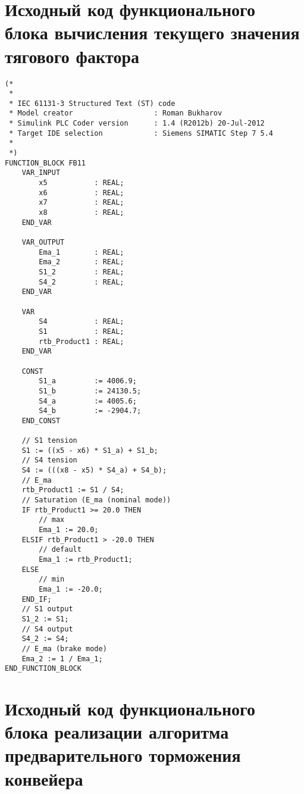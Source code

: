 \section{Исходный код функционального блока вычисления текущего значения тягового фактора} \label{AppendixB2}
\fontsize{11pt}{12pt}\selectfont

\begin{verbatim}
(*
 *
 * IEC 61131-3 Structured Text (ST) code
 * Model creator                   : Roman Bukharov
 * Simulink PLC Coder version      : 1.4 (R2012b) 20-Jul-2012
 * Target IDE selection            : Siemens SIMATIC Step 7 5.4
 *
 *)
FUNCTION_BLOCK FB11
    VAR_INPUT
        x5           : REAL;
        x6           : REAL;
        x7           : REAL;
        x8           : REAL;
    END_VAR
    
    VAR_OUTPUT
        Ema_1        : REAL;
        Ema_2        : REAL;
        S1_2         : REAL;
        S4_2         : REAL;
    END_VAR
    
    VAR
        S4           : REAL;
        S1           : REAL;
        rtb_Product1 : REAL;
    END_VAR
    
    CONST
        S1_a         := 4006.9;
        S1_b         := 24130.5;
        S4_a         := 4005.6;
        S4_b         := -2904.7;
    END_CONST
    
    // S1 tension
    S1 := ((x5 - x6) * S1_a) + S1_b;
    // S4 tension
    S4 := (((x8 - x5) * S4_a) + S4_b);
    // E_ma
    rtb_Product1 := S1 / S4;
    // Saturation (E_ma (nominal mode))
    IF rtb_Product1 >= 20.0 THEN 
        // max 
        Ema_1 := 20.0;
    ELSIF rtb_Product1 > -20.0 THEN 
        // default 
        Ema_1 := rtb_Product1;
    ELSE 
        // min 
        Ema_1 := -20.0;
    END_IF;
    // S1 output
    S1_2 := S1;
    // S4 output
    S4_2 := S4;
    // E_ma (brake mode)
    Ema_2 := 1 / Ema_1;
END_FUNCTION_BLOCK
\end{verbatim}

\section{Исходный код функционального блока реализации алгоритма предварительного торможения конвейера} \label{AppendixB3}
\fontsize{11pt}{12pt}\selectfont

